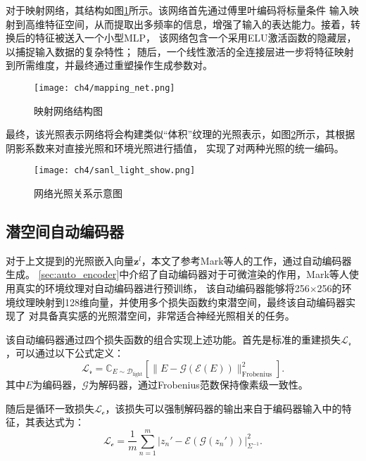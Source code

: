 对于映射网络，其结构如图\ref{fig:mapping_cn}所示。该网络首先通过傅里叶编码将标量条件
输入映射到高维特征空间，从而提取出多频率的信息，增强了输入的表达能力。接着，转换后的特征被送入一个小型MLP，
该网络包含一个采用ELU激活函数的隐藏层，以捕捉输入数据的复杂特性；
随后，一个线性激活的全连接层进一步将特征映射到所需维度，并最终通过重塑操作生成参数对。

\begin{figure}[htb]
  \centering
  \texttt{[image: ch4/mapping\_net.png]}
  \caption{映射网络结构图}
  \label{fig:mapping_cn}
\end{figure}

最终，该光照表示网络将会构建类似“体积”纹理的光照表示，如图\ref{fig:nl_light_volume}所示，其根据阴影系数来对直接光照和环境光照进行插值，
实现了对两种光照的统一编码。

\begin{figure}[htb]
  \centering
  \texttt{[image: ch4/sanl\_light\_show.png]}
  \caption{网络光照关系示意图}
  \label{fig:nl_light_volume}
\end{figure}

\subsection{潜空间自动编码器}

对于上文提到的光照嵌入向量${\boldsymbol{z}}^l$，本文了参考Mark等人\cite{boss2021neural}的工作，通过自动编码器生成。
\ref{sec:auto_encoder}中介绍了自动编码器对于可微渲染的作用，Mark等人使用真实的环境纹理对自动编码器进行预训练，
该自动编码器能够将256$\times$256的环境纹理映射到128维向量，并使用多个损失函数约束潜空间，最终该自动编码器实现了
对具备真实感的光照潜空间，非常适合神经光照相关的任务。

该自动编码器通过四个损失函数的组合实现上述功能。首先是标准的重建损失$\mathcal{L}_{\mathcal{r}}$，可以通过以下公式定义：
\begin{equation}
  \label{eq:reconstruction_loss}
  \mathcal{L}_{\mathcal{r}}=\mathbb{C}_{E\sim\mathcal{D}_{\mathrm{light}}}\left[\|E-\mathcal{G}\left(\mathcal{E}(E)\right)\|_{\mathrm{Frobenius}}^2\right].
  \end{equation}
  其中$E$为编码器，$\mathcal{G}$为解码器，通过Frobenius范数保持像素级一致性。
  
  随后是循环一致损失$\mathcal{L}_{\mathcal{c}}$，该损失可以强制解码器的输出来自于编码器输入中的特征，其表达式为：
  \begin{equation}
  \label{eq:cycle_loss}
  \mathcal{L}_{\mathcal{c}}=\frac{1}{m}\sum_{n=1}^{m}\left|z_n'-\mathcal{E}\left(\mathcal{G}\left(z_n'\right)\right)\right|_{\Sigma^{-1}}^2.
  \end{equation}
  
